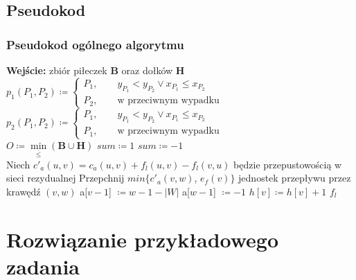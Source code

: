 \documentclass[10pt,a4paper]{article}
\begin{document}
	\subsection{Pseudokod}
	
	\subsubsection{Pseudokod ogólnego algorytmu}
	
	\begin{algorithmic}
		\State \textbf{Wejście:} zbiór piłeczek $\mathbf{B}$ oraz dołków $\mathbf{H}$  \\
		
		\State $p_{1}(P_{1}, P_{2}) \coloneqq \begin{cases} P_{1}, \qquad 
		y_{P_{1}} < y_{P_{2}} \vee x_{P_{1}} \leq x_{P_{2}} \\ P_{2}, \qquad \text{w przeciwnym wypadku}\end{cases} $ 
		\State $p_{2}(P_{1}, P_{2}) \coloneqq \begin{cases} P_{1}, \qquad 
		y_{P_{1}} < y_{P_{2}} \vee x_{P_{1}} \leq x_{P_{2}} \\ P_{1}, \qquad \text{w przeciwnym wypadku}\end{cases} $ 
		\\
		\State $O \coloneqq \min\limits_{\overline{\leq}}(\mathbf{B} \cup \mathbf{H})$
		\State $sum \coloneqq 1$
		\Else
		\State $sum \coloneqq -1$
		\EndIf \\
		\State Niech $c'_a(u, v) = c_a(u, v) + f_l(u, v) - f_l(v, u)$ będzie przepustowością w sieci rezydualnej
		\State Przepchnij $min \lbrace c'_a(v, w)$, $e_f(v)\rbrace$ jednostek przepływu przez krawędź $(v, w)$
		\State a[$v - 1$] $\coloneqq w - 1 - |W|$
		\EndIf
		\State a[$w - 1$] $\coloneqq -1$
		\EndIf
		\Else 
		$h[v] \coloneqq h[v] + 1$
		\EndFor
		\EndIf
		\State
		\Return $f_l$
		\EndFunction
	\end{algorithmic}
	
	\section{Rozwiązanie przykładowego zadania}
	
\end{document}
